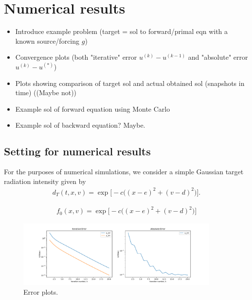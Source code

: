 \section{Numerical results}
\begin{itemize}
    \item Introduce example problem (target = sol to forward/primal eqn with a known source/forcing $g$)
    \item Convergence plots (both "iterative" error $u^{(k)} - u^{(k-1)}$ and "absolute" error $u^{(k)}-u^{(*)}$)
    \item Plots showing comparison of target sol and actual obtained sol (snapshots in time) ((Maybe not))
    \item Example sol of forward equation using Monte Carlo
    \item Example sol of backward equation? Maybe.
\end{itemize}

\subsection{Setting for numerical results}
For the purposes of numerical simulations, we consider a simple Gaussian target radiation intensity given by
%
\begin{align}
    d_T(t,x,v) = \exp\Big[ -c\big( {(x-e)}^2 + {(v-d)}^2 \big) \Big].
\end{align}
%

%
\begin{align}
    f_0(x,v) = \exp\Big[ -c\big( {(x-e)}^2 + {(v-d)}^2 \big) \Big]
\end{align}
%

\begin{figure}[h]
    \centering
    \includegraphics[width=0.9\textwidth]{error_plots.pdf}
    \caption{Error plots.}\label{fig:error-plots}
\end{figure}
